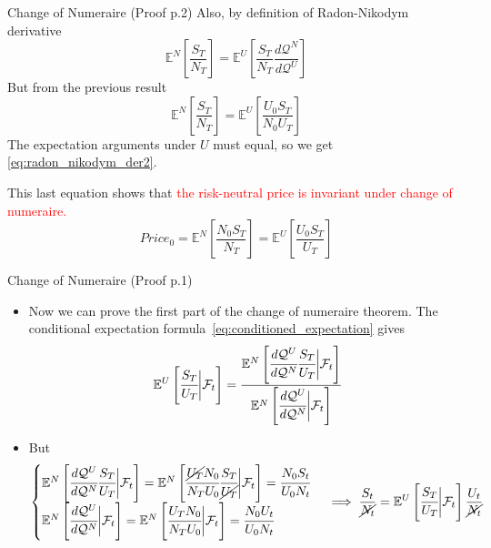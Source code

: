 \documentclass{beamer}
\begin{document}
\begin{frame}{Change of Numeraire (Proof p.2)}
  Also, by definition of Radon-Nikodym derivative
  \begin{equation*}
    \mathbb{E}^N\left[\frac{S_T}{N_T}\right] = \mathbb{E}^U\left[\frac{S_T}{N_T} \frac{d\mathcal{Q}^N}{d\mathcal{Q}^U}\right]
  \end{equation*}
	\pause
  But from the previous result
  \begin{equation*}
    \mathbb{E}^N\left[\frac{S_T}{N_T}\right] = \mathbb{E}^U\left[\frac{U_0 S_T}{N_0 U_T}\right]
  \end{equation*}
  The expectation arguments under $U$ must equal, so we get \cref{eq:radon_nikodym_der2}. 
  \pause
  
  This last equation shows that \textcolor{red}{the risk-neutral price is invariant under change of numeraire.}
    \begin{equation*}
    Price_0 = \mathbb{E}^N\left[\frac{N_0 S_T}{N_T}\right] = \mathbb{E}^U\left[\frac{U_0 S_T}{U_T}\right]
  \end{equation*}
  
\end{frame}

\begin{frame}{Change of Numeraire (Proof p.1)}
  \begin{itemize}
  \item<1-> Now we can prove the first part of the change of numeraire theorem. The conditional expectation formula~\cref{eq:conditioned_expectation} gives
    \begin{equation*}
      \mathbb{E}^U\left[\cfrac{S_T}{U_T}\bigg|\mathcal{F}_t\right]=\cfrac{\mathbb{E}^N\left[\cfrac{d\mathcal{Q}^U}{d\mathcal{Q}^N}\cfrac{S_T}{U_T}\bigg|\mathcal{F}_t\right]}{\mathbb{E}^N\left[\cfrac{d\mathcal{Q}^U}{d\mathcal{Q}^N}\bigg|\mathcal{F}_t\right]}
    \end{equation*}
  \item<2-> But 
    \begin{equation*}
      \begin{cases}
	\mathbb{E}^N\left[\cfrac{d\mathcal{Q}^U}{d\mathcal{Q}^N}\cfrac{S_T}{U_T}\bigg|\mathcal{F}_t\right]= \mathbb{E}^N\left[\cfrac{\cancel{U_T} N_0}{N_T U_0}\cfrac{S_T}{\cancel{U_T}}\bigg|\mathcal{F}_t\right]=\cfrac{N_0 S_t}{U_0 N_t} \\
	\mathbb{E}^N\left[\cfrac{d\mathcal{Q}^U}{d\mathcal{Q}^N}\bigg|\mathcal{F}_t\right]= \mathbb{E}^N\left[\cfrac{U_T N_0}{N_T U_0}\bigg|\mathcal{F}_t\right] = \cfrac{N_0 U_t}{U_0 N_t}
      \end{cases}\implies
      \frac{S_t}{\cancel{N_t}}=\mathbb{E}^U\left[\cfrac{S_T}{U_T}\bigg|\mathcal{F}_t\right]\frac{U_t}{\cancel{N_t}}
    \end{equation*}
  \end{itemize}
\end{frame}	
\end{document}
